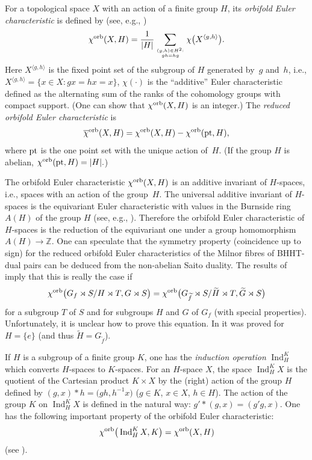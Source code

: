 For a topological space $X$ with an action of a finite group $H$, its {\em orbifold Euler characteristic}
is defined by (see, e.g., \cite{AS,HH})
\begin{gather}\label{eqn:chi_orb}
{\chi}^{\rm orb}(X,H)=\frac{1}{\vert H\vert}\sum_{{(g,h)\in H^2:}\atop{gh=hg}}\chi\big(X^{\langle g,h\rangle}\big).
\end{gather}
Here $X^{\langle g,h\rangle}$ is the fixed point set of the subgroup of $H$ generated by~$g$ and~$h$, i.e.,
$X^{\langle g,h\rangle}=\{x\in X\colon gx=hx=x\}$, $\chi(\cdot)$ is the ``additive'' Euler characteristic defined as the alternating sum of the ranks of the cohomology groups with compact support. (One can show that ${\chi}^{\rm orb}(X,H)$ is an integer.) The {\em reduced orbifold Euler characteristic} is
\[
{\overline{\chi}}^{ \rm orb}(X,H)={\chi}^{\rm orb}(X,H)-{\chi}^{\rm orb}({\rm pt},H),
\]
where ${\rm pt}$ is the one point set with the unique action of~$H$. (If the group $H$ is abelian,
${\chi}^{\rm orb}({\rm pt},H)=\vert H\vert.$)

The orbifold Euler characteristic ${\chi}^{\rm orb}(X,H)$ is an additive invariant of $H$-spaces, i.e., spaces with an action of the group~$H$. The universal additive invariant of $H$-spaces is the equivariant Euler characteristic with values in the Burnside ring $A(H)$ of the group $H$ (see, e.g., \cite[Section~3]{RMS}). Therefore the orbifold Euler characteristic of $H$-spaces is the reduction of the equivariant one under a group homomorphism $A(H)\to{\mathbb Z}$. One can speculate that the symmetry property (coincidence up to sign) for the reduced orbifold Euler characteristics of the Milnor fibres of BHHT-dual pairs can be deduced from the non-abelian Saito duality. The results of \cite{EG-IMRN} imply that this is really the case if
\[
 \chi^{\rm orb}\big(G_f\rtimes S/H\rtimes T, G\rtimes S\big)=
 \chi^{\rm orb}\big(G_{\widetilde{f}}\rtimes S/\widetilde{H}\rtimes T,
 \widetilde{G}\rtimes S\big)
\]
for a subgroup $T$ of $S$ and for subgroups $H$ and $G$ of $G_f$ (with special properties).
Unfortunately, it is unclear how to prove this equation. In \cite{EG-1811} it was proved for $H=\{e\}$
(and thus $\widetilde{H}=G_{\widetilde{f}}$).

If $H$ is a subgroup of a finite group $K$, one has the {\em induction operation} $\operatorname{Ind}_H^K$ which converts $H$-spaces to $K$-spaces. For an $H$-space $X$, the space $\operatorname{Ind}_H^K X$ is the quotient of the Cartesian product $K\times X$ by the (right) action of the group $H$ defined by $(g,x)*h=\big(gh, h^{-1}x\big)$ ($g\in K$, $x\in X$, $h\in H$). The action of the group $K$ on $\operatorname{Ind}_H^K X$ is defined in the natural way: $g'*(g,x)=(g'g,x)$. One has the following important property of the orbifold Euler characteristic:
\[
{\chi}^{\rm orb}\big(\operatorname{Ind}_H^K X, K\big)={\chi}^{\rm orb}(X, H)
\]
(see \cite[Theorem~1]{GLM}).

